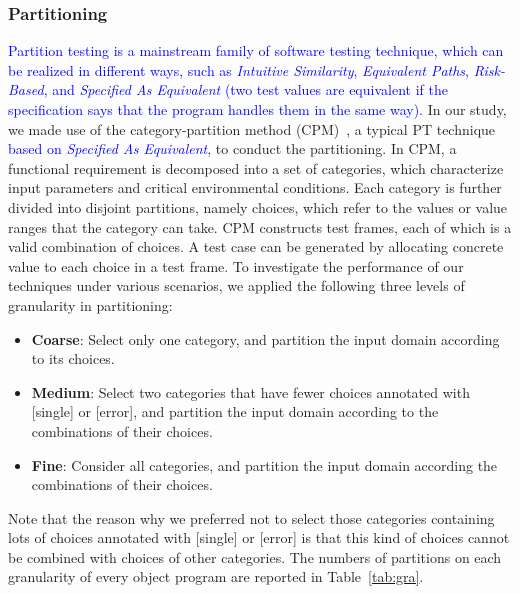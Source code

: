 \documentclass[10pt,journal,compsoc]{IEEEtran}
\begin{document}
\subsubsection{Partitioning}
\label{sec:partitioning}

\textcolor{blue}{Partition testing is a mainstream family of software testing technique, which can be realized in different ways, such as \emph{Intuitive Similarity}, \emph{Equivalent Paths}, \emph{Risk-Based}, and \emph{Specified As Equivalent} (two test values are equivalent if the specification says that the program handles them in the same way).} In our study, we made use of the category-partition method (CPM)~\cite{Ostrand88}, a typical PT technique \textcolor{blue}{based on \emph{Specified As Equivalent}}, to conduct the partitioning. In CPM, a functional requirement is decomposed into a set of categories, which characterize input parameters and critical environmental conditions. Each category is further divided into disjoint partitions, namely choices, which refer to the values or value ranges that the category can take. CPM constructs test frames, each of which is a valid combination of choices. A test case can be generated by allocating concrete value to each choice in a test frame. To investigate the performance of our techniques under various scenarios, we applied the following three levels of granularity in partitioning:

\begin{itemize}
\item \textbf{Coarse}: Select only one category, and partition the input domain according to its choices.
\item \textbf{Medium}: Select two categories that have fewer choices annotated with [single] or [error], and partition the input domain according to the combinations of their choices.
\item \textbf{Fine}: Consider all categories, and partition the input domain according the combinations of their choices.
\end{itemize}

Note that the reason why we preferred not to select those categories containing lots of choices annotated with [single] or [error] is that this kind of choices cannot be combined with choices of other categories. The numbers of partitions on each granularity of every object program are reported in Table~\ref{tab:gra}.

\end{document}

